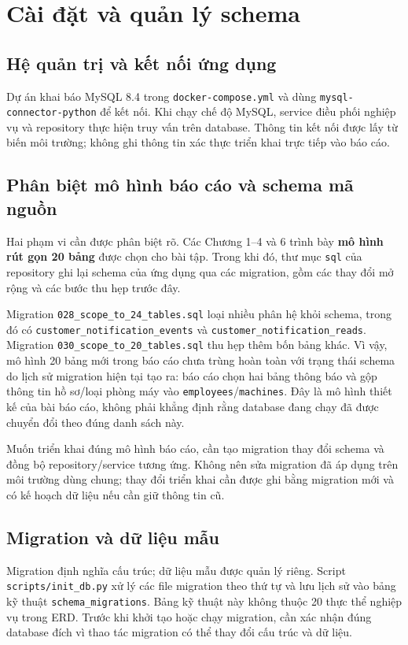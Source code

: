 \chapter{Cài đặt và quản lý schema}

\section{Hệ quản trị và kết nối ứng dụng}
Dự án khai báo MySQL 8.4 trong \texttt{docker-compose.yml} và dùng \texttt{mysql-connector-python} để kết nối. Khi chạy chế độ MySQL, service điều phối nghiệp vụ và repository thực hiện truy vấn trên database. Thông tin kết nối được lấy từ biến môi trường; không ghi thông tin xác thực triển khai trực tiếp vào báo cáo.

\section{Phân biệt mô hình báo cáo và schema mã nguồn}
Hai phạm vi cần được phân biệt rõ. Các Chương 1--4 và 6 trình bày \textbf{mô hình rút gọn 20 bảng} được chọn cho bài tập. Trong khi đó, thư mục \texttt{sql} của repository ghi lại schema của ứng dụng qua các migration, gồm các thay đổi mở rộng và các bước thu hẹp trước đây.

Migration \texttt{028\_scope\_to\_24\_tables.sql} loại nhiều phân hệ khỏi schema, trong đó có \texttt{customer\_notification\_events} và \texttt{customer\_notification\_reads}. Migration \texttt{030\_scope\_to\_20\_tables.sql} thu hẹp thêm bốn bảng khác. Vì vậy, mô hình 20 bảng mới trong báo cáo chưa trùng hoàn toàn với trạng thái schema do lịch sử migration hiện tại tạo ra: báo cáo chọn hai bảng thông báo và gộp thông tin hồ sơ/loại phòng máy vào \texttt{employees}/\texttt{machines}. Đây là mô hình thiết kế của bài báo cáo, không phải khẳng định rằng database đang chạy đã được chuyển đổi theo đúng danh sách này.

Muốn triển khai đúng mô hình báo cáo, cần tạo migration thay đổi schema và đồng bộ repository/service tương ứng. Không nên sửa migration đã áp dụng trên môi trường dùng chung; thay đổi triển khai cần được ghi bằng migration mới và có kế hoạch dữ liệu nếu cần giữ thông tin cũ.

\section{Migration và dữ liệu mẫu}
Migration định nghĩa cấu trúc; dữ liệu mẫu được quản lý riêng. Script \texttt{scripts/init\_db.py} xử lý các file migration theo thứ tự và lưu lịch sử vào bảng kỹ thuật \texttt{schema\_migrations}. Bảng kỹ thuật này không thuộc 20 thực thể nghiệp vụ trong ERD. Trước khi khởi tạo hoặc chạy migration, cần xác nhận đúng database đích vì thao tác migration có thể thay đổi cấu trúc và dữ liệu.

